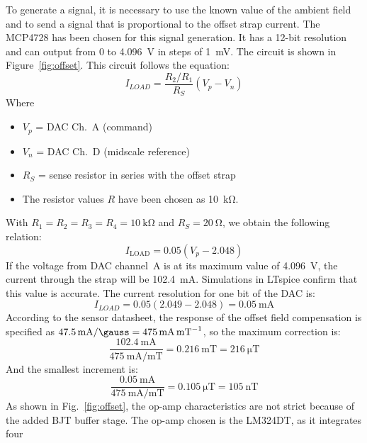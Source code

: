 \documentclass[11pt]{article}
\begin{document}
To generate a signal, it is necessary to use the known value of the ambient field
and to send a signal that is proportional to the offset strap current. The MCP4728 has 
been chosen for this signal generation. It has a 12-bit resolution and can 
output from 0 to \SI{4.096}{\volt} in steps of \SI{1}{\milli\volt}. The circuit
is shown in Figure~\ref{fig:offset}. This circuit follows the equation:
\begin{equation}
  I_{LOAD} = \frac{R_2/R_1}{R_S}(V_p-V_n)
\end{equation}
Where
\begin{itemize}
  \item $V_p$ = DAC Ch.~A (command)
  \item $V_n$ = DAC Ch.~D (midscale reference)
  \item $R_S$ = sense resistor in series with the offset strap
  \item The resistor values $R$ have been chosen as \SI{10}{\kilo\ohm}.
\end{itemize}
With $R_1 = R_2 = R_3 = R_4 = \SI{10}{\kilo\ohm}$ and $R_S = \SI{20}{\ohm}$, we obtain the 
following relation:
\begin{equation}
  I_{\text{LOAD}} = 0.05(V_p - 2.048)
\end{equation}
If the voltage from DAC channel~A is at its maximum value of \SI{4.096}{\volt}, 
the current through the strap will be \SI{102.4}{\milli\ampere}. Simulations in 
LTspice confirm that this value is accurate. The current resolution for one bit of 
the DAC is:
\begin{equation}
  I_{LOAD}=0.05(2.049-2.048) = \SI{0.05}{\milli\ampere}
\end{equation}
According to the sensor datasheet, the response of the offset field compensation
is specified as $\SI{47.5}{\milli\ampere\per\gauss} = \SI{475}{\milli\ampere\per\milli\tesla}$,
so the maximum correction is:
\begin{equation}
  \frac{\SI{102.4}{\milli\ampere}}{\SI{475}{\milli\ampere\per\milli\tesla}}=\SI{0.216}{\milli\tesla}
  =\SI{216}{\micro\tesla}
\end{equation}
And the smallest increment is:
\begin{equation}
  \frac{\SI{0.05}{\milli\ampere}}{\SI{475}{\milli\ampere\per\milli\tesla}}=\SI{0.105}{\micro\tesla}
  =\SI{105}{\nano\tesla}
\end{equation}
As shown in Fig.~\ref{fig:offset}, the op-amp characteristics are not strict because 
of the added BJT buffer stage. The op-amp chosen is the LM324DT, as it integrates four 
\end{document}
